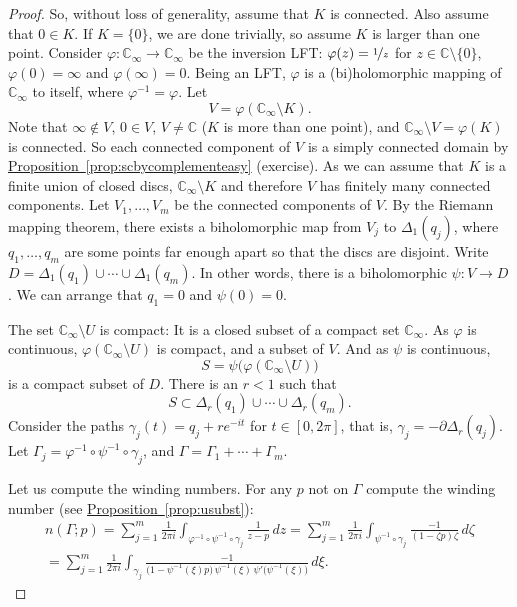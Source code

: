\documentclass[12pt,openany]{book}
\newcommand{\C}{{\mathbb{C}}}
\theoremstyle{plain}
\theoremstyle{remark}
\theoremstyle{definition}
\theoremstyle{exercise}
\theoremstyle{example}
\newcommand{\propref}[1]{\hyperref[#1]{Proposition~\ref*{#1}}}
\begin{document}
\begin{proof}
So, without loss of generality, assume that $K$ is connected.
Also assume that $0 \in K$.  If $K= \{0 \}$, we are done trivially, so
assume $K$ is larger than one point.
Consider $\varphi \colon \C_\infty \to \C_\infty$ be the inversion
LFT:
$\varphi(z) = \nicefrac{1}{z}$ for $z \in \C \setminus \{ 0 \}$,
$\varphi(0) = \infty$ and $\varphi(\infty) = 0$.
Being an LFT, $\varphi$ is a (bi)holomorphic
mapping of $\C_\infty$ to itself, where $\varphi^{-1} = \varphi$.  Let
\begin{equation*}
V = \varphi(\C_\infty \setminus K) .
\end{equation*}
Note that $\infty \notin V$, $0 \in V$, $V \not= \C$ ($K$ is more than one
point), and
$\C_\infty \setminus V = \varphi(K)$ is connected.
So each connected component of $V$ is a simply connected domain
by \propref{prop:scbycomplementeasy} (exercise).
As we can assume that $K$ is a finite union of closed discs,
$\C_\infty \setminus K$ and therefore $V$ has finitely many connected components.
Let $V_1,\ldots,V_m$ be the connected
components of $V$.
By the Riemann mapping theorem, there exists
a biholomorphic map from $V_j$ to $\Delta_1(q_j)$,
where $q_1,\ldots,q_m$ are some points
far enough apart so that the discs are disjoint.
Write $D = \Delta_1(q_1) \cup \cdots \cup \Delta_1(q_m)$.
In other words, there is
a biholomorphic $\psi \colon V \to D$.  We can arrange that $q_1=0$
and $\psi(0)=0$.

The set $\C_\infty \setminus U$ is compact: It is a closed subset of
a compact set $\C_\infty$.  As $\varphi$ is continuous,
$\varphi(\C_\infty \setminus U)$ is compact, and a subset of $V$.
And as $\psi$ is continuous,
\begin{equation*}
S = \psi\bigl(\varphi(\C_\infty \setminus U)\bigr)
\end{equation*}
is a compact subset of $D$.  There is an $r < 1$ such that
\begin{equation*}
S \subset \Delta_r(q_1) \cup \cdots \cup \Delta_r(q_m) .
\end{equation*}
Consider the paths $\gamma_j(t) = q_j + r e^{-it}$ for $t \in
[0,2\pi]$,
that is, $\gamma_j = -\partial
\Delta_r(q_j)$.
Let $\Gamma_j=\varphi^{-1} \circ \psi^{-1} \circ \gamma_j$, and $\Gamma = \Gamma_1 +
\cdots + \Gamma_m$.

Let us compute the winding numbers.
For any $p$ not on $\Gamma$ compute
the winding number (see \propref{prop:usubst}):
\begin{multline*}
n(\Gamma;p) = 
\sum_{j=1}^m
\frac{1}{2\pi i}
\int_{\varphi^{-1} \circ \psi^{-1} \circ \gamma_j}
\frac{1}{z-p} \, dz
=
\sum_{j=1}^m
\frac{1}{2\pi i}
\int_{\psi^{-1} \circ \gamma_j}
\frac{-1}{(1-\zeta p) \zeta} \, d\zeta
\\
=
\sum_{j=1}^m
\frac{1}{2\pi i}
\int_{\gamma_j}
\frac{-1}{ \bigl( 1-\psi^{-1}(\xi)p \bigr)
\,
\psi^{-1}(\xi)
\,
\psi' \bigl(\psi^{-1}(\xi)\bigr)} \, d \xi .
\end{multline*}


\end{proof}
\end{document}
